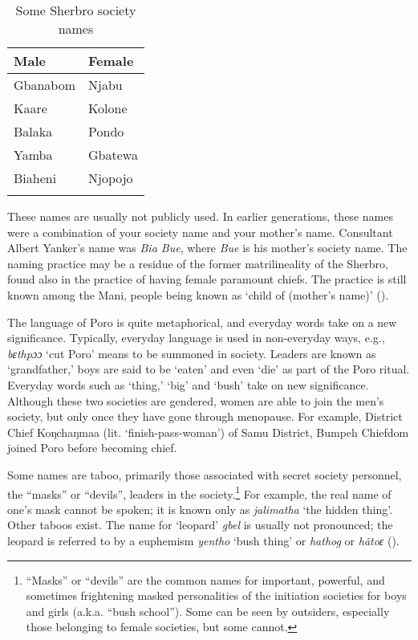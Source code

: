\begin{table}
\caption{\label{tab:wordcat:19}Some Sherbro society names}


\begin{tabular}{ll}
\lsptoprule
Male & Female\\
\midrule
Gbanabom & Njabu\\
Kaare & Kolone\\
Balaka & Pondo\\
Yamba & Gbatewa\\
Biaheni & Njopojo\\
\lspbottomrule
\end{tabular}
\end{table}

These names are usually not publicly used. In earlier generations, these names were a combination of your society name and your mother's name. Consultant Albert Yanker's name was \textit{Bia Bue}, where \textit{Bue} is his mother's society name. The naming practice may be a residue of the former matrilineality of the Sherbro, found also in the practice of having female paramount chiefs. The practice is still known among the Mani, people being known as ‘child of (mother's name)' (\citealt{Childs2011}).

The language of Poro is quite metaphorical, and everyday words take on a new significance. Typically, everyday language is used in non-everyday ways, e.g., \textit{bɛthpɔɔ} ‘cut Poro' means to be summoned in society. Leaders are known as ‘grandfather,' boys are said to be ‘eaten' and even ‘die' as part of the Poro ritual. Everyday words such as ‘thing,' ‘big' and ‘bush' take on new significance. Although these two societies are gendered, women are able to join the men's society, but only once they have gone through menopause. For example, District Chief Koŋchaŋmaa (lit. ‘finish-pass-woman') of Samu District, Bumpeh Chiefdom joined Poro before becoming chief.

Some names are taboo, primarily those associated with secret society personnel, the “masks” or “devils”, leaders in the society.\footnote{“Masks” or “devils” are the common names for important, powerful, and sometimes frightening masked personalities of the initiation societies for boys and girls (a.k.a. “bush school”). Some can be seen by outsiders, especially those belonging to female societies, but some cannot.} For example, the real name of one's mask cannot be spoken; it is known only as \textit{jalimatha} ‘the hidden thing'. Other taboos exist. The name for ‘leopard' \textit{gbel} is usually not pronounced; the leopard is referred to by a euphemism \textit{yentho} ‘bush thing' or \textit{hathog} or \textit{hãtoɛ} (\citealt[83]{Pichl1967}).

